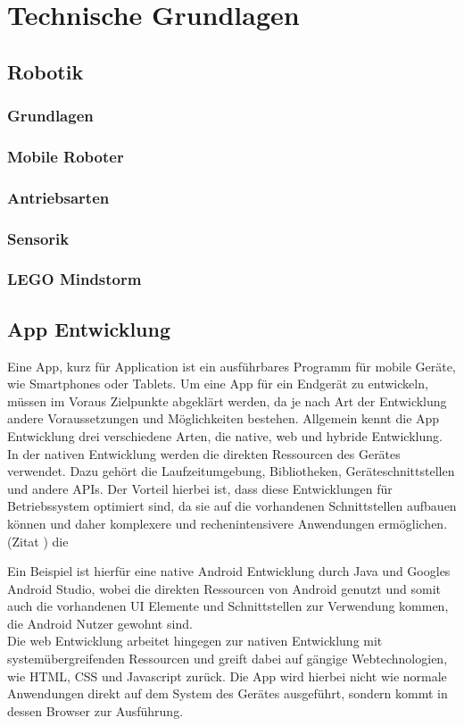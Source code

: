 \section{Technische Grundlagen}
\subsection{Robotik} %

\subsubsection{Grundlagen}
\subsubsection{Mobile Roboter}
\subsubsection{Antriebsarten}
\subsubsection{Sensorik}
\subsubsection{LEGO Mindstorm}

\newpage
\subsection{App Entwicklung} %

Eine App, kurz für Application ist ein ausführbares Programm für mobile Geräte, wie Smartphones oder Tablets. Um eine App für ein Endgerät zu entwickeln, müssen im Voraus Zielpunkte abgeklärt werden, da je nach Art der Entwicklung andere Voraussetzungen und Möglichkeiten bestehen. Allgemein kennt die App Entwicklung drei verschiedene Arten, die native, web und hybride Entwicklung.\\
In der nativen Entwicklung werden die direkten Ressourcen des Gerätes verwendet. Dazu gehört die Laufzeitumgebung, Bibliotheken, Geräteschnittstellen und andere APIs. Der Vorteil hierbei ist, dass diese Entwicklungen für Betriebssystem optimiert sind, da sie auf die vorhandenen Schnittstellen aufbauen können und daher komplexere und rechenintensivere Anwendungen ermöglichen.(Zitat ) die 


Ein Beispiel ist hierfür eine native Android Entwicklung durch Java und Googles Android Studio, wobei die direkten Ressourcen von Android genutzt und somit auch die vorhandenen UI Elemente und Schnittstellen zur Verwendung kommen, die Android Nutzer gewohnt sind.\\
Die web Entwicklung arbeitet hingegen zur nativen Entwicklung mit systemübergreifenden Ressourcen und greift dabei auf gängige Webtechnologien, wie HTML, CSS und Javascript zurück. Die App wird hierbei nicht wie normale Anwendungen direkt auf dem System des Gerätes ausgeführt, sondern kommt in dessen Browser zur Ausführung.

